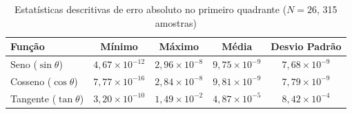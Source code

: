 \begin{table}[htbp]
\centering
\caption{Estatísticas descritivas de erro absoluto no primeiro quadrante ($N = 26$, 315 amostras)}
\label{tab:estatistica_26}
\begin{tabular}{lcccc}
\hline
Função & Mínimo & Máximo & Média & Desvio Padrão \\
\hline
Seno ($\sin\theta$) & $4,67 \times 10^{-12}$ & $2,96 \times 10^{-8}$ & $9,75 \times 10^{-9}$ & $7,68 \times 10^{-9}$ \\
Cosseno ($\cos\theta$) & $7,77 \times 10^{-16}$ & $2,84 \times 10^{-8}$ & $9,81 \times 10^{-9}$ & $7,79 \times 10^{-9}$ \\
Tangente ($\tan\theta$) & $3,20 \times 10^{-10}$ & $1,49 \times 10^{-2}$ & $4,87 \times 10^{-5}$ & $8,42 \times 10^{-4}$ \\
\hline
\end{tabular}
\end{table}